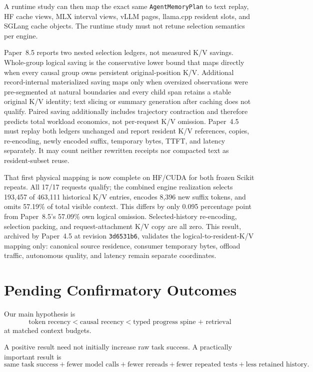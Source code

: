 \documentclass[11pt]{article}
\begin{document}
A runtime study can then map the exact same \texttt{AgentMemoryPlan} to text
replay, HF cache views, MLX interval views, vLLM pages, llama.cpp resident slots,
and SGLang cache objects. The runtime study must not retune selection semantics
per engine.

Paper~8.5 reports two nested selection ledgers, not measured K/V savings.
Whole-group logical saving is the conservative lower bound that maps directly
when every causal group owns persistent original-position K/V.  Additional
record-internal materialized saving maps only when oversized observations were
pre-segmented at natural boundaries and every child span retains a stable
original K/V identity; text slicing or summary generation after caching does
not qualify.  Paired saving additionally includes trajectory contraction and
therefore predicts total workload economics, not per-request K/V omission.
Paper~4.5 must replay both ledgers unchanged and report resident K/V references,
copies, re-encoding, newly encoded suffix, temporary bytes, TTFT, and latency
separately.  It may count neither rewritten receipts nor compacted text as
resident-subset reuse.

That first physical mapping is now complete on HF/CUDA for both frozen Scikit
repeats.  All 17/17 requests qualify; the combined engine realization selects
193,457 of 463,111 historical K/V entries, encodes 8,396 new suffix tokens, and
omits 57.19\% of total visible context.  This differs by only 0.095 percentage
point from Paper~8.5's 57.09\% own logical omission.  Selected-history
re-encoding, selection packing, and request-attachment K/V copy are all zero.
This result, archived by Paper~4.5 at revision \texttt{3d6531b6}, validates the
logical-to-resident-K/V mapping only: canonical source residence, consumer
temporary bytes, offload traffic, autonomous quality, and latency remain
separate coordinates.

\section{Pending Confirmatory Outcomes}

Our main hypothesis is
\[
\text{token recency}
<
\text{causal recency}
<
\text{typed progress spine + retrieval}
\]
at matched context budgets.

A positive result need not initially increase raw task success. A practically
important result is
\[
\text{same task success}
+
\text{fewer model calls}
+
\text{fewer rereads}
+
\text{fewer repeated tests}
+
\text{less retained history}.
\]
\end{document}
